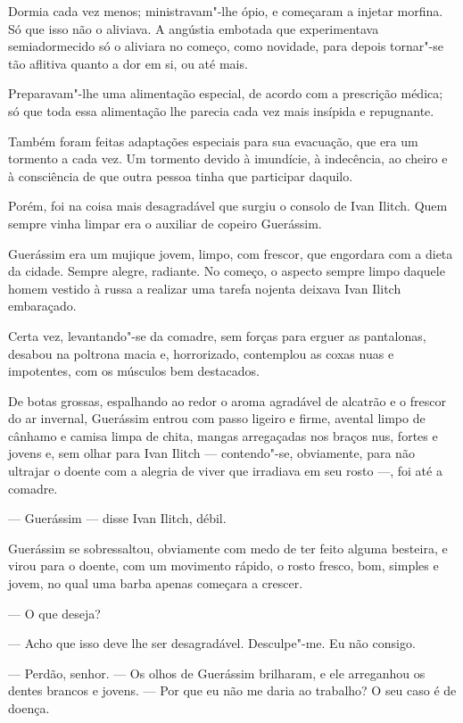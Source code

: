 Dormia cada vez menos; ministravam"-lhe ópio, e começaram a injetar
morfina. Só que isso não o aliviava. A angústia embotada que
experimentava semiadormecido só o aliviara no começo, como novidade,
para depois tornar"-se tão aflitiva quanto a dor em si, ou até mais.

Preparavam"-lhe uma alimentação especial, de acordo com a prescrição
médica; só que toda essa alimentação lhe parecia cada vez mais insípida
e repugnante.

Também foram feitas adaptações especiais para sua evacuação, que era um
tormento a cada vez. Um tormento devido à imundície, à indecência, ao
cheiro e à consciência de que outra pessoa tinha que participar daquilo.

Porém, foi na coisa mais desagradável que surgiu o consolo de Ivan
Ilitch. Quem sempre vinha limpar era o auxiliar de copeiro Guerássim.

Guerássim era um mujique jovem, limpo, com frescor, que engordara com a
dieta da cidade. Sempre alegre, radiante. No começo, o aspecto sempre
limpo daquele homem vestido à russa a realizar uma tarefa nojenta
deixava Ivan Ilitch embaraçado.

Certa vez, levantando"-se da comadre, sem forças para erguer as
pantalonas, desabou na poltrona macia e, horrorizado, contemplou as
coxas nuas e impotentes, com os músculos bem destacados.

De botas grossas, espalhando ao redor o aroma agradável de alcatrão e o
frescor do ar invernal, Guerássim entrou com passo ligeiro e firme,
avental limpo de cânhamo e camisa limpa de chita, mangas arregaçadas nos
braços nus, fortes e jovens e, sem olhar para Ivan Ilitch ---
contendo"-se, obviamente, para não ultrajar o doente com a alegria de
viver que irradiava em seu rosto ---, foi até a comadre.

--- Guerássim --- disse Ivan Ilitch, débil.

Guerássim se sobressaltou, obviamente com medo de ter feito alguma
besteira, e virou para o doente, com um movimento rápido, o rosto
fresco, bom, simples e jovem, no qual uma barba apenas começara a
crescer.

--- O que deseja?

--- Acho que isso deve lhe ser desagradável. Desculpe"-me. Eu não consigo.

--- Perdão, senhor. --- Os olhos de Guerássim brilharam, e ele arreganhou os
dentes brancos e jovens. --- Por que eu não me daria ao trabalho? O seu
caso é de doença.


